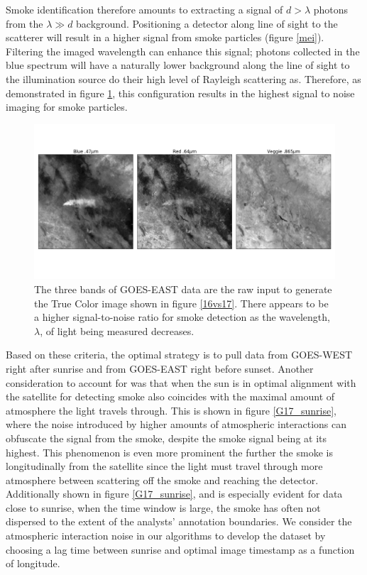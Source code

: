\documentclass{article}
\begin{document}
Smoke identification therefore amounts to extracting a signal of \(d > \lambda\) photons from the \(\lambda \gg d\) background. Positioning a detector along line of sight to the scatterer will result in a higher signal from smoke particles (figure \ref{mei}). Filtering the imaged wavelength can enhance this signal; photons collected in the blue spectrum will have a naturally lower background along the line of sight to the illumination source do their high level of Rayleigh scattering as. Therefore, as demonstrated in figure \ref{bands}, this configuration results in the highest signal to noise imaging for smoke particles. 



\begin{figure}
    \centering
    \includegraphics[width=14cm]{figures/GOES16_bands.png}
    \caption{The three bands of GOES-EAST data are the raw input to generate the True Color image shown in figure \ref{16vs17}. There appears to be a higher signal-to-noise ratio for smoke detection as the wavelength, \(\lambda\), of light being measured decreases.}\label{bands}
\end{figure}





Based on these criteria, the optimal strategy is to pull data from GOES-WEST right after sunrise and from GOES-EAST right before sunset. Another consideration to account for was that when the sun is in optimal alignment with the satellite for detecting smoke also coincides with the maximal amount of atmosphere the light travels through. This is shown in figure \ref{G17_sunrise}, where the noise introduced by higher amounts of atmospheric interactions can obfuscate the signal from the smoke, despite the smoke signal being at its highest. This phenomenon is even more prominent the further the smoke is longitudinally from the satellite since the light must travel through more atmosphere between scattering off the smoke and reaching the detector. Additionally shown in figure \ref{G17_sunrise}, and is especially evident for data close to sunrise, when the time window is large, the smoke has often not dispersed to the extent of the analysts' annotation boundaries. We consider the atmospheric interaction noise in our algorithms to develop the dataset by choosing a lag time between sunrise and optimal image timestamp as a function of longitude. 
\end{document}
